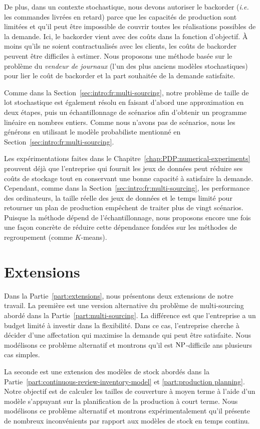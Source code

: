 De plus, dans un contexte stochastique, nous devons autoriser le backorder (\emph{i.e.} les commandes livrées en retard) parce que les capacités de production sont limitées et qu'il peut être impossible de couvrir toutes les réalisations possibles de la demande.
Ici, le backorder vient avec des coûts dans la fonction d'objectif.
\`A moins qu'ils ne soient contractualisés avec les clients, les coûts de backorder peuvent être difficiles à estimer.
Nous proposons une méthode basée sur le problème du \emph{vendeur de journaux} (l'un des plus anciens modèles stochastiques) pour lier le coût de backorder et la part souhaitée de la demande satisfaite.


Comme dans la Section~\ref{sec:intro:fr:multi-sourcing}, notre problème de taille de lot stochastique est également résolu en faisant d'abord une approximation en deux étapes, puis un échantillonnage de scénarios afin d'obtenir un programme linéaire en nombres entiers.
Comme nous n'avons pas de scénarios, nous les générons en utilisant le modèle probabiliste mentionné en Section~\ref{sec:intro:fr:multi-sourcing}.


\medskip


Les expérimentations faites dans le Chapitre~\ref{chap:PDP:numerical-experiments} prouvent déjà que l'entreprise qui fournit les jeux de données peut réduire ses coûts de stockage tout en conservant une bonne capacité à satisfaire la demande.
Cependant, comme dans la Section~\ref{sec:intro:fr:multi-sourcing}, les performance des ordinateurs, la taille réelle des jeux de données et le temps limité pour retourner un plan de production empêchent de traiter plus de vingt scénarios.
Puisque la méthode dépend de l'échantillonnage, nous proposons encore une fois une façon concrète de réduire cette dépendance fondées sur les méthodes de regroupement (comme $K$-means).


\section{Extensions}


Dans la Partie~\ref{part:extensions}, nous présentons deux extensions de notre travail.
La première est une version alternative du problème de multi-sourcing abordé dans la Partie~\ref{part:multi-sourcing}.
La différence est que l'entreprise a un budget limité à investir dans la flexibilité.
Dans ce cas, l'entreprise cherche à décider d'une affectation qui maximise la demande qui peut être satisfaite.
Nous modélisons ce problème alternatif et montrons qu'il est $\operatorname{NP}$-difficile ans plusieurs cas simples.


La seconde est une extension des modèles de stock abordés dans la Partie~\ref{part:continuous-review-inventory-model} et \ref{part:production planning}.
Notre objectif est de calculer les tailles de couverture à moyen terme à l'aide d'un modèle s'appuyant sur la planification de la production à court terme.
Nous modélisons ce problème alternatif et montrons expérimentalement qu'il présente de nombreux inconvénients par rapport aux modèles de stock en temps continu.